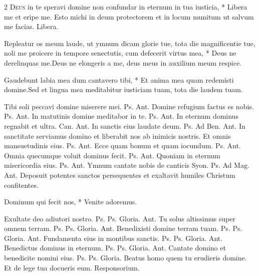 \begin{multicols*}{2}
\lettrine[lines=2]{\zallmancaps \color{Red} D}{eus} \hypertarget{deus-in-te}{\label{deus-in-te}} in te speravi domine non confundar in eternum in tua iusticia, * Libera me et eripe me. \V Esto michi in deum protectorem et in locum munitum ut salvum me facias. Libera.
\begin{responsory}
{Repleatur os meum laude, ut ymnum dicam glorie tue, tota die magnificentie tue, noli me proicere in tempore senectutis, cum defecerit virtus mea, * Deus ne derelinquas me.}{Deus ne elongeris a me, deus meus in auxilium meum respice.}
\end{responsory}%
\begin{responsory-doxology}
{Gaudebunt labia mea dum cantavero tibi, * Et anima mea quam redemisti domine.}{Sed et lingua mea meditabitur iusticiam tuam, tota die laudem tuam.}
\end{responsory-doxology}%
 Tibi soli peccavi domine miserere mei. {\color{Red} Ps.}  {\color{Red} Ant.} Domine refugium factus es nobis. {\color{Red} Ps.}  {\color{Red} Ant.} In matutinis domine meditabor in te. {\color{Red} Ps.}  {\color{Red} Ant.} In eternum dominus regnabit et ultra. {\color{Red} Can.}  {\color{Red} Ant.} In sanctis eius laudate deum. {\color{Red} Ps.}  {\color{Red} Ad Ben. Ant.} In sanctitate serviamus domino et liberabit nos ab inimicis nostris.
 Et omnis mansuetudinis eius. {\color{Red} Ps.}  {\color{Red} Ant.} Ecce quam bonum et quam iocundum. {\color{Red} Ps.}  {\color{Red} Ant.} Omnia quecumque voluit dominus fecit. {\color{Red} Ps.}  {\color{Red} Ant.} Quoniam in eternum misericordia eius. {\color{Red} Ps.}  {\color{Red} Ant.} Ymnum cantate nobis de canticis Syon. {\color{Red} Ps.}  {\color{Red} Ad Mag. Ant.} Deposuit potentes sanctos persequentes et exaltavit humiles Christum confitentes.
{\color{Red} }
\par {}
\begin{invitatory}
{Dominum qui fecit nos, * Venite adoremus.}
\end{invitatory}
 Exultate deo adiutori nostro. {\color{Red} Ps.}  {\color{Red} Ps.}  Gloria. {\color{Red} Ant.} Tu solus altissimus super omnem terram. {\color{Red} Ps.}  {\color{Red} Ps.}  Gloria. {\color{Red} Ant.} Benedixisti domine terram tuam. {\color{Red} Ps.}  {\color{Red} Ps.}  Gloria. {\color{Red} Ant.} Fundamenta eius in montibus sanctis. {\color{Red} Ps.}  {\color{Red} Ps.}  Gloria. {\color{Red} Ant.} Benedictus dominus in eternum. {\color{Red} Ps.}  {\color{Red} Ps.}  Gloria. {\color{Red} Ant.} Cantate domino et benedicite nomini eius. {\color{Red} Ps.}  {\color{Red} Ps.}  Gloria. \V Beatus homo quem tu erudieris domine. \R Et de lege tua docueris eum. {\color{Red} Responsorium.}

\end{multicols*}
